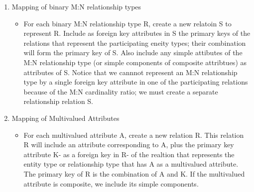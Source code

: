 \documentclass[12pt]{article}
\begin{document}
\begin{enumerate}
\begin{itemize}
				\end{itemize}
			\item
				Mapping of binary M:N relationship types
				\begin{itemize}
					\item
						For each binary M:N relationship type R, create a new relatoin S to represent R. Include as foreign key attributes in S the primary keys of the relations that represent the participating eneity types; their combination will form the primary key of S. Also include any simple attibutes of the M:N relationship type (or simple components of composite attribtues) as attributes of S. Notice that we cannnot represent an M:N relationship type by a single foreign key attribute in one of the participating relations because of the M:N cardinality ratio; we must create a separate relationship relation S.
				\end{itemize}
			\item
				Mapping of Multivalued Attributes
				\begin{itemize}
					\item
						For each multivalued attribute A, create a new relation R. This relation R will include an attribute corresponding to A, plus the primary key attribute K- as a foreign key in R- of the realtion that represents the entity type or relationship type that has A as a multivalued attribute. The primary key of R is the combination of A and K. If the multivalued attribute is composite, we include its simple components.
				\end{itemize}
		\end{enumerate}
\end{document}
